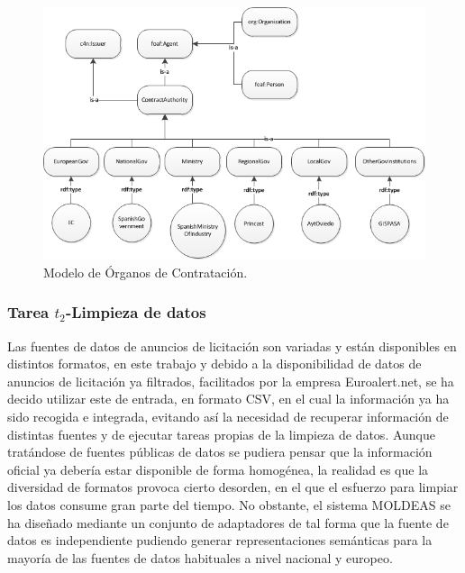 \begin{figure}[!htp]
    \centering
	\includegraphics[width=16cm]{images/phd/modelo/contract-auth}
	\caption{Modelo de Órganos de Contratación.}
	\label{fig:modelo-contract-auth}
\end{figure}



\clearpage

\subsubsection{Tarea $t_2$-Limpieza de datos}
Las fuentes de datos de anuncios de licitación son variadas y están disponibles en distintos formatos, en este 
trabajo y debido a la disponibilidad de datos de anuncios de licitación ya filtrados, facilitados por la 
empresa Euroalert.net, se ha decido utilizar este \dataset de entrada, en formato \gls{CSV}, en el cual la información ya ha sido 
recogida e integrada, evitando así la necesidad de recuperar información de distintas fuentes y de ejecutar 
tareas propias de la limpieza de datos. Aunque tratándose de fuentes públicas de datos se pudiera pensar 
que la información oficial ya debería estar disponible de forma homogénea, la realidad es que la diversidad 
de formatos provoca cierto desorden, en el que el esfuerzo para limpiar los datos consume gran parte del tiempo. No obstante, 
el sistema \gls{MOLDEAS} se ha diseñado mediante un conjunto de adaptadores de tal forma que la fuente de datos es independiente 
pudiendo generar representaciones semánticas para la mayoría de las fuentes de datos habituales a nivel nacional y 
europeo.


